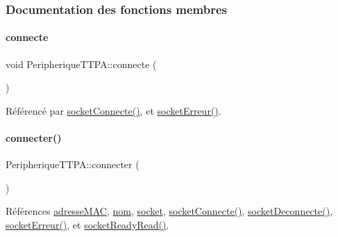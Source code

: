 \subsubsection{Documentation des fonctions membres}
\mbox{\label{class_peripherique_t_t_p_a_ae95f1fe6bb1908b5eb2d34a469f7f873}} 
\paragraph{\texorpdfstring{connecte}{connecte}}
{\footnotesize\ttfamily void Peripherique\+T\+T\+P\+A\+::connecte (\begin{DoxyParamCaption}{ }\end{DoxyParamCaption})\hspace{0.3cm}{\ttfamily [signal]}}



Référencé par \hyperlink{class_peripherique_t_t_p_a_aab23a43f5c9d70c30df3dbf4aeeeff9d}{socket\+Connecte()}, et \hyperlink{class_peripherique_t_t_p_a_a85811ace874ff7cea3437146511f1b2c}{socket\+Erreur()}.

\mbox{\label{class_peripherique_t_t_p_a_a8afa92f7c3ae6e1edc30f5c8b386af81}} 
\paragraph{\texorpdfstring{connecter()}{connecter()}}
{\footnotesize\ttfamily Peripherique\+T\+T\+P\+A\+::connecter (\begin{DoxyParamCaption}{ }\end{DoxyParamCaption})}



Références \hyperlink{class_peripherique_t_t_p_a_a444063230c83cf81eff8a3a55736f2cf}{adresse\+M\+AC}, \hyperlink{class_peripherique_t_t_p_a_afafe3566b4b5357819811218b9a4244f}{nom}, \hyperlink{class_peripherique_t_t_p_a_ab66f30984a7f9fa17fd28391efe968a9}{socket}, \hyperlink{class_peripherique_t_t_p_a_aab23a43f5c9d70c30df3dbf4aeeeff9d}{socket\+Connecte()}, \hyperlink{class_peripherique_t_t_p_a_adb04c45864ea56a80a0716cde0a31856}{socket\+Deconnecte()}, \hyperlink{class_peripherique_t_t_p_a_a85811ace874ff7cea3437146511f1b2c}{socket\+Erreur()}, et \hyperlink{class_peripherique_t_t_p_a_a4e1d676e59b293161a40ee6428a79871}{socket\+Ready\+Read()}.



